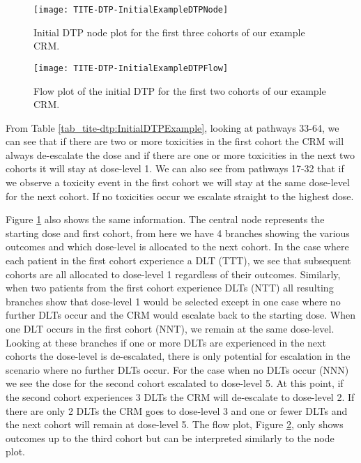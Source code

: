 \begin{figure}[h!]
	\centering
	\caption[Initial DTP node plot.]{Initial DTP node plot for the first three cohorts of our example CRM.}
	\label{fig_tite-dtp:InitialDTPExampleNode}
	\texttt{[image: TITE-DTP-InitialExampleDTPNode]}
\end{figure}

\begin{figure}[h!]
	\centering
	\caption[Initial DTP flow plot.]{Flow plot of the initial DTP for the first two cohorts of our example CRM.}
	\label{fig_tite-dtp:InitialDTPExampleFlow}
	\texttt{[image: TITE-DTP-InitialExampleDTPFlow]}
\end{figure}

From Table \ref{tab_tite-dtp:InitialDTPExample}, looking at pathways 33-64, we can see that if there are two or more toxicities in the first cohort the CRM will always de-escalate the dose and if there are one or more toxicities in the next two cohorts it will stay at dose-level 1. We can also see from pathways 17-32 that if we observe a toxicity event in the first cohort we will stay at the same dose-level for the next cohort. If no toxicities occur we escalate straight to the highest dose. 

Figure \ref{fig_tite-dtp:InitialDTPExampleNode} also shows the same information. The central node represents the starting dose and first cohort, from here we have 4 branches showing the various outcomes and which dose-level is allocated to the next cohort. In the case where each patient in the first cohort experience a DLT (TTT), we see that subsequent cohorts are all allocated to dose-level 1 regardless of their outcomes. Similarly, when two patients from the first cohort experience DLTs (NTT) all resulting branches show that dose-level 1 would be selected except in one case where no further DLTs occur and the CRM would escalate back to the starting dose. When one DLT occurs in the first cohort (NNT), we remain at the same dose-level. Looking at these branches if one or more DLTs are experienced in the next cohorts the dose-level is de-escalated, there is only potential for escalation in the scenario where no further DLTs occur. For the case when no DLTs occur (NNN) we see the dose for the second cohort escalated to dose-level 5. At this point, if the second cohort experiences 3 DLTs the CRM will de-escalate to dose-level 2. If there are only 2 DLTs the CRM goes to dose-level 3 and one or fewer DLTs and the next cohort will remain at dose-level 5. The flow plot, Figure \ref{fig_tite-dtp:InitialDTPExampleFlow}, only shows outcomes up to the third cohort but can be interpreted similarly to the node plot.

